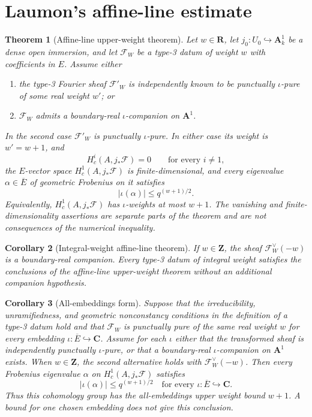 \documentclass[10pt]{article}
\newtheorem{theorem}{Theorem}[section]
\newtheorem{corollary}[theorem]{Corollary}
\theoremstyle{definition}
\newcommand{\Aone}{\mathbf A^1}
\begin{document}
\section{Laumon's affine-line estimate}

\begin{theorem}[Affine-line upper-weight theorem]
Let \(w\in\mathbf R\), let \(j_0:U_0\hookrightarrow\Aone_k\) be a dense
open immersion, and let \(\mathcal F_W\) be a type-3 datum of weight \(w\)
with coefficients in \(E\).  Assume either
\begin{enumerate}
\item the type-3 Fourier sheaf \(\mathcal F'_W\) is independently known to
      be punctually \(\iota\)-pure of some real weight \(w'\); or
\item \(\mathcal F_W\) admits a boundary-real \(\iota\)-companion on
      \(\mathbf A^1\).
\end{enumerate}
In the second case \(\mathcal F'_W\) is punctually \(\iota\)-pure.  In
either case its weight is \(w'=w+1\), and
\[
  H_c^i(A,j_*\mathcal F)=0\qquad\text{for every }i\ne1,
\]
the \(E\)-vector space \(H_c^1(A,j_*\mathcal F)\) is finite-dimensional,
and every eigenvalue \(\alpha\in\overline E\) of geometric Frobenius on it
satisfies
\[
  |\iota(\alpha)|\le q^{(w+1)/2}.
\]
Equivalently, \(H_c^1(A,j_*\mathcal F)\) has \(\iota\)-weights at most
\(w+1\).  The vanishing and finite-dimensionality assertions are separate
parts of the theorem and are not consequences of the numerical inequality.
\end{theorem}

\begin{corollary}[Integral-weight affine-line theorem]
If \(w\in\mathbf Z\), the sheaf \(\mathcal F_W^\vee(-w)\) is a boundary-real
companion.  Every type-3 datum of integral weight satisfies the conclusions
of the affine-line upper-weight theorem without an additional companion
hypothesis.
\end{corollary}

\begin{corollary}[All-embeddings form]
Suppose that the irreducibility, unramifiedness, and geometric
nonconstancy conditions in the definition of a type-3 datum hold and that
\(\mathcal F_W\) is punctually pure of the same real
weight \(w\) for every embedding
\(\iota:\overline E\hookrightarrow\mathbf C\).  Assume for each \(\iota\)
either that the transformed sheaf is independently punctually
\(\iota\)-pure, or that a boundary-real \(\iota\)-companion on
\(\mathbf A^1\) exists.  When \(w\in\mathbf Z\), the second alternative
holds with \(\mathcal F_W^\vee(-w)\).  Then every Frobenius
eigenvalue \(\alpha\) on \(H_c^1(A,j_*\mathcal F)\) satisfies
\[
 |\iota(\alpha)|\le q^{(w+1)/2}
 \quad\text{for every }\iota:\overline E\hookrightarrow\mathbf C.
\]
Thus this cohomology group has the all-embeddings upper weight bound
\(w+1\).  A bound for one chosen embedding does not give this conclusion.
\end{corollary}
\end{document}
